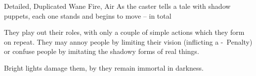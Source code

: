   {Detailed, Duplicated}%
  {Wane}%
  {Fire, Air}%
  {}%
  {As the caster tells a tale with shadow puppets, each one stands and begins to move --  in total}%
  {They play out their roles, with only a couple of simple actions which they form on repeat.
  They may annoy people by limiting their vision (inflicting a -~Penalty) or confuse people by imitating the shadowy forms of real things.

  Bright lights damage them, by they remain immortal in darkness.}
